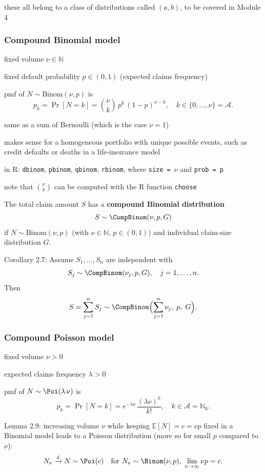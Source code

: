 \documentclass[11pt]{article}
\newcommand{\noi}{\noindent}
\begin{document}
\noi these all belong to a class of distributions called \((a,b)\), to be covered in Module 4

\subsubsection{Compound Binomial model}

\noi fixed volume \(\nu \in \mathbb{N}\)

\noi fixed default probability \(p \in (0,1)\) (expected claims frequency)

\noi pmf of \(N \sim \mathrm{Binom}(\nu,p)\) is
\[
p_k = \Pr[N = k]
= \binom{\nu}{k}\,p^k\,(1-p)^{\nu-k},
\quad k \in \{0,\dots,\nu\} = \mathcal{A}.
\]

\noi same as a sum of Bernoulli (which is the case \(\nu=1\))

\noi makes sense for a homogeneous portfolio with unique possible events, such as credit defaults or deaths in a life‐insurance model

\noi in R: \texttt{dbinom}, \texttt{pbinom}, \texttt{qbinom}, \texttt{rbinom}, where \texttt{size = \(\nu\)} and \texttt{prob = p}

\noi note that \(\binom{\nu}{k}\) can be computed with the R function \texttt{choose}

\noi The total claim amount \(S\) has a \textbf{compound Binomial distribution}
\[
S\sim\CompBinom(\nu,p,G)
\]
if \(N\sim\mathrm{Binom}(\nu,p)\) (with \(\nu\in\mathbb{N}\), \(p\in(0,1)\)) and individual claim‐size distribution \(G\).

\noi Corollary 2.7: Assume \(S_1,\dots,S_n\) are independent with
\[
S_j\sim\CompBinom(\nu_j,p,G),
\quad j=1,\dots,n.
\]
Then
\[
S=\sum_{j=1}^n S_j
\sim
\CompBinom\Bigl(\sum_{j=1}^n\nu_j,\;p,\;G\Bigr).
\]

\subsubsection{Compound Poisson model}

\noi fixed volume \(\nu > 0\)

\noi expected claims frequency \(\lambda > 0\)

\noi pmf of \(N \sim \Poi(\lambda\,\nu)\) is
\[
p_k = \Pr[N = k]
    = e^{-\lambda \nu}\,\frac{(\lambda \nu)^k}{k!},
    \quad k \in \mathcal{A} = \mathbb{N}_0.
\]

\noi Lemma 2.9: increasing volume \(\nu\) while keeping \(\mathbb{E}[N] = c = \nu p\) fixed in a Binomial model leads to a Poisson distribution (more so for small \(p\) compared to \(\nu\)):
\[
N_\nu \xrightarrow{d} N \sim \Poi(c)
\quad\text{for }N_\nu\sim\Binom(\nu,p),\ \lim_{\nu\to\infty}\nu p=c.
\]
\end{document}
